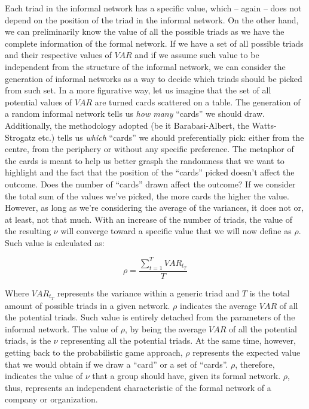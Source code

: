 \documentclass{article}
\begin{document}
Each triad in the informal network has a specific value, which – again – does not depend on the position of the triad in the informal network. On the other hand, we can preliminarily know the value of all the possible triads as we have the complete information of the formal network. If we have a set of all possible triads and their respective values of $VAR$ and if we assume such value to be independent from the structure of the informal network, we can consider the generation of informal networks as a way to decide which triads should be picked from such set. In a more figurative way, let us imagine that the set of all potential values of $VAR$ are turned cards scattered on a table. The generation of a random informal network tells us \emph{how many} “cards” we should draw. Additionally, the methodology adopted (be it Barabasi-Albert, the Watts-Strogatz etc.) tells us \emph{which} “cards” we should preferentially pick: either from the centre, from the periphery or without any specific preference. The metaphor of the cards is meant to help us better grasph the randomness that we want to highlight and the fact that the position of the “cards” picked doesn’t affect the outcome. Does the number of “cards” drawn affect the outcome? If we consider the total sum of the values we’ve picked, the more cards the higher the value. However, as long as we’re considering the average of the variances, it does not or, at least, not that much. With an increase of the number of triads, the value of the resulting $\nu$ will converge toward a specific value that we will now define as $\rho$. Such value is calculated as:

\begin{equation}
\rho=\frac{\sum_{t=1}^{T}VAR_{t_T}}{T}
\end{equation}

Where ${VAR}_{t_T}$ represents the variance within a generic triad and $T$ is the total amount of possible triads in a given network.
$\rho$ indicates the average $VAR$ of all the potential triads. Such value is entirely detached from the parameters of the informal network. The value of $\rho$, by being the average $VAR$ of all the potential triads, is the $\nu$ representing all the potential triads. At the same time, however, getting back to the probabilistic game approach, $\rho$ represents the expected value that we would obtain if we draw a “card” or a set of “cards”. $\rho$, therefore, indicates the value of $\nu$ that a group should have, given its formal network. $\rho$, thus, represents an independent characteristic of the formal network of a company or organization. 
\end{document}
